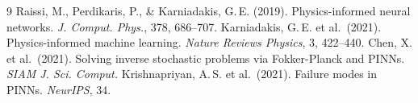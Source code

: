 \documentclass[12pt,a4paper]{article}
\begin{document}
\begin{thebibliography}{9}
 Raissi, M., Perdikaris, P., \& Karniadakis, G.\,E. (2019).
Physics-informed neural networks. \textit{J. Comput. Phys.}, 378, 686--707.
 Karniadakis, G.\,E. et al.\ (2021). Physics-informed machine learning.
\textit{Nature Reviews Physics}, 3, 422--440.
 Chen, X. et al.\ (2021). Solving inverse stochastic problems via
Fokker-Planck and PINNs. \textit{SIAM J. Sci. Comput.}
 Krishnapriyan, A.\,S. et al.\ (2021). Failure modes in PINNs.
\textit{NeurIPS}, 34.
\end{thebibliography}
\end{document}
